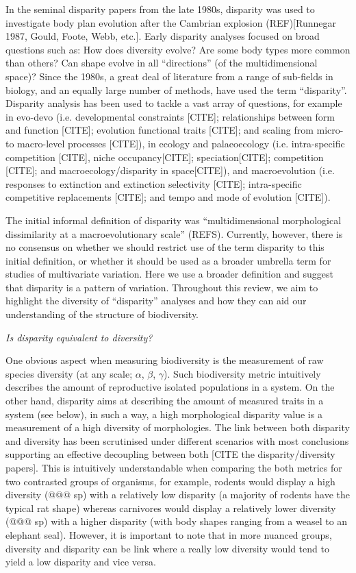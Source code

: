 \documentclass[12pt,letterpaper]{article}
\renewcommand{\subsection}[1]{%
\bigskip
\begin{center}
\begin{large}
\normalfont\itshape #1
\end{large}
\end{center}}
\begin{document}
In the seminal disparity papers from the late 1980s, disparity was used to investigate body plan evolution after the Cambrian explosion (REF)[Runnegar 1987, Gould, Foote, Webb, etc.].
Early disparity analyses focused on broad questions such as: How does diversity evolve? Are some body types more common than others? Can shape evolve in all ``directions'' (of the multidimensional space)?
Since the 1980s, a great deal of literature from a range of sub-fields in biology, and an equally large number of methods, have used the term ``disparity''.
Disparity analysis has been used to tackle a vast array of questions, for example in evo-devo (i.e. developmental constraints [CITE]; relationships between form and function [CITE]; evolution functional traits [CITE]; and scaling from micro- to macro-level processes [CITE]), in ecology and palaeoecology (i.e. intra-specific competition [CITE], niche occupancy[CITE]; speciation[CITE]; competition [CITE]; and macroecology/disparity in space[CITE]), and macroevolution (i.e. responses to extinction and extinction selectivity [CITE]; intra-specific competitive replacements [CITE]; and tempo and mode of evolution [CITE]).

The initial informal definition of disparity was ``multidimensional morphological dissimilarity at a macroevolutionary scale'' (REFS).
Currently, however, there is no consensus on whether we should restrict use of the term disparity to this initial definition, or whether it should be used as a broader umbrella term for studies of multivariate variation. 
Here we use a broader definition and suggest that disparity is a pattern of variation.
Throughout this review, we aim to highlight the diversity of ``disparity'' analyses and how they can aid our understanding of the structure of biodiversity.


\subsection{Is disparity equivalent to diversity?}
One obvious aspect when measuring biodiversity is the measurement of raw species diversity (at any scale; $\alpha$, $\beta$, $\gamma$).
Such biodiversity metric intuitively describes the amount of reproductive isolated populations in a system.
On the other hand, disparity aims at describing the amount of measured traits in a system (see below), in such a way, a high morphological disparity value is a measurement of a high diversity of morphologies.
The link between both disparity and diversity has been scrutinised under different scenarios with most conclusions supporting an effective decoupling between both [CITE the disparity/diversity papers].
This is intuitively understandable when comparing the both metrics for two contrasted groups of organisms, for example, rodents would display a high diversity (@@@ sp) with a relatively low disparity (a majority of rodents have the typical rat shape) whereas carnivores would display a relatively lower diversity (@@@ sp) with a higher disparity (with body shapes ranging from a weasel to an elephant seal).
However, it is important to note that in more nuanced groups, diversity and disparity can be link where a really low diversity would tend to yield a low disparity and vice versa.
\end{document}
